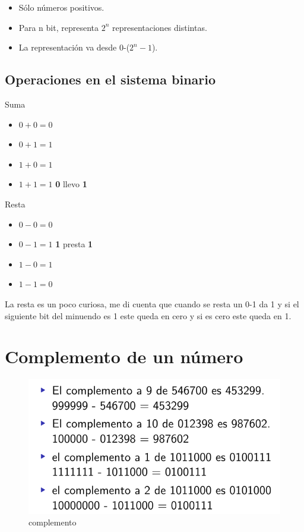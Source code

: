 \documentclass[12pt,letterpaper]{book}
\begin{document}
    \begin{itemize}
    \item Sólo números positivos.
    \item Para n bit, representa $2^n$ representaciones distintas.
    \item La representación va desde 0-($2^n-1$).
    \end{itemize}
   
   \subsection{Operaciones en el sistema binario}

\begin{multicols}{2}
Suma

\begin{itemize}
\item $0+0=0$
\item $0+1=1$
\item $1+0=1$
\item $1+1=1$ \textbf{0} llevo \textbf{1}

\end{itemize}

Resta

\begin{itemize}
\item $0-0=0$
\item $0-1=1$ \textbf{1} presta \textbf{1}
\item $1-0=1$
\item $1-1=0$ 

\end{itemize}

La resta es un poco curiosa, me di cuenta que cuando se resta un 0-1 da 1 y si el siguiente bit del minuendo es 1 este queda en cero y si es cero este queda en 1. 

\end{multicols}   
   
  \section{Complemento de un número}
  
  \begin{figure}[H]
  \centering
  \includegraphics[width=1\linewidth]{figures/complemento.png}
  \caption{complemento}
  \label{complemento}
  \end{figure}
  \vspace{0.2cm}
\end{document}
